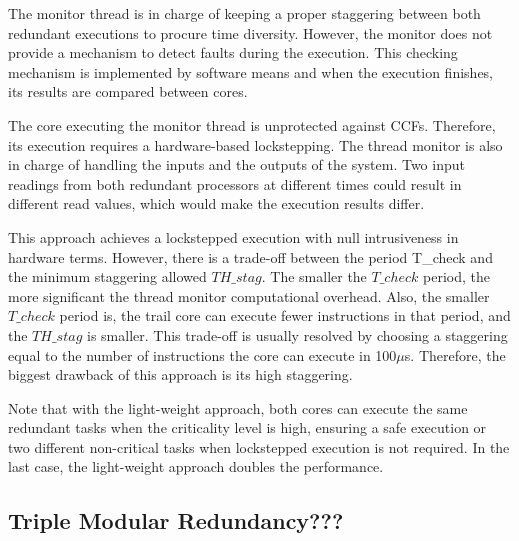 The monitor thread is in charge of keeping a proper staggering between both redundant executions to procure time diversity. However, the monitor does not provide a mechanism to detect faults during the execution. This checking mechanism is implemented by software means and when the execution finishes, its results are compared between cores.

The core executing the monitor thread is unprotected against CCFs. Therefore, its execution requires a hardware-based lockstepping. The thread monitor is also in charge of handling the inputs and the outputs of the system. Two input readings from both redundant processors at different times could result in different read values, which would make the execution results differ.  

This approach achieves a lockstepped execution with null intrusiveness in hardware terms. However, there is a trade-off between the period T\_check and the minimum staggering allowed $TH\_stag$. The smaller the $T\_check$ period, the more significant the thread monitor computational overhead. Also, the smaller $T\_check$ period is, the trail core can execute fewer instructions in that period, and the $TH\_stag$ is smaller. This trade-off is usually resolved by choosing a staggering equal to the number of instructions the core can execute in 100$\mu$s. Therefore, the biggest drawback of this approach is its high staggering.

Note that with the light-weight approach, both cores can execute the same redundant tasks when the criticality level is high, ensuring a safe execution or two different non-critical tasks when lockstepped execution is not required. In the last case, the light-weight approach doubles the performance.

\bigskip


\subsection{Triple Modular Redundancy???}
